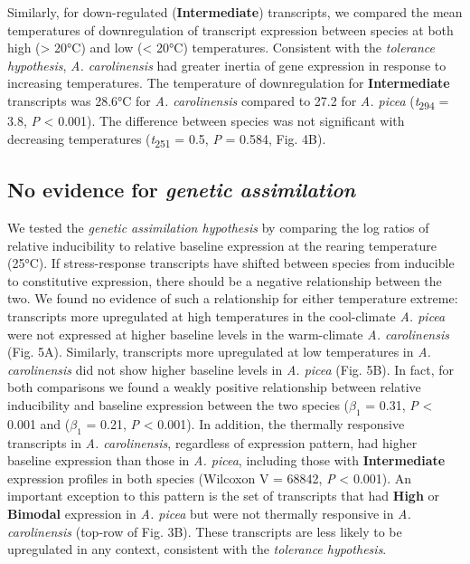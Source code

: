 \documentclass[]{article}
\begin{document}
Similarly, for down-regulated (\textbf{Intermediate}) transcripts, we
compared the mean temperatures of downregulation of transcript
expression between species at both high (\textgreater{} 20°C) and low
(\textless{} 20°C) temperatures. Consistent with the \emph{tolerance
hypothesis}, \emph{A. carolinensis} had greater inertia of gene
expression in response to increasing temperatures. The temperature of
downregulation for \textbf{Intermediate} transcripts was 28.6°C for
\emph{A. carolinensis} compared to 27.2 for \emph{A. picea}
(\emph{t}\textsubscript{294} = 3.8, \emph{P} \textless{} 0.001). The
difference between species was not significant with decreasing
temperatures (\emph{t}\textsubscript{251} = 0.5, \emph{P} = 0.584, Fig.
4B).

\subsection{No evidence for \emph{genetic
assimilation}}\label{no-evidence-for-genetic-assimilation}

We tested the \emph{genetic assimilation hypothesis} by comparing the
log ratios of relative inducibility to relative baseline expression at
the rearing temperature (25°C). If stress-response transcripts have
shifted between species from inducible to constitutive expression, there
should be a negative relationship between the two. We found no evidence
of such a relationship for either temperature extreme: transcripts more
upregulated at high temperatures in the cool-climate \emph{A. picea}
were not expressed at higher baseline levels in the warm-climate
\emph{A. carolinensis} (Fig. 5A). Similarly, transcripts more
upregulated at low temperatures in \emph{A. carolinensis} did not show
higher baseline levels in \emph{A. picea} (Fig. 5B). In fact, for both
comparisons we found a weakly positive relationship between relative
inducibility and baseline expression between the two species
(\(\beta_1\) = 0.31, \emph{P} \textless{} 0.001 and (\(\beta_1\) = 0.21,
\emph{P} \textless{} 0.001). In addition, the thermally responsive
transcripts in \emph{A. carolinensis}, regardless of expression pattern,
had higher baseline expression than those in \emph{A. picea}, including
those with \textbf{Intermediate} expression profiles in both species
(Wilcoxon V = 68842, \emph{P} \textless{} 0.001). An important exception
to this pattern is the set of transcripts that had \textbf{High} or
\textbf{Bimodal} expression in \emph{A. picea} but were not thermally
responsive in \emph{A. carolinensis} (top-row of Fig. 3B). These
transcripts are less likely to be upregulated in any context, consistent
with the \emph{tolerance hypothesis}.
\end{document}
